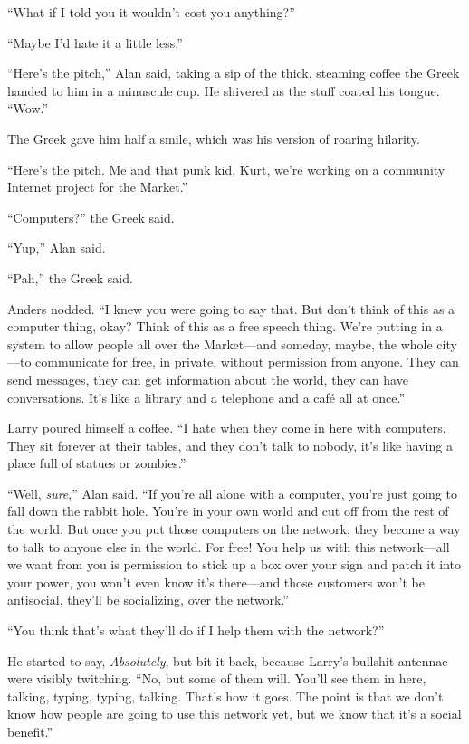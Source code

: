 ``What if I told you it wouldn't cost you anything?''

``Maybe I'd hate it a little less.''

``Here's the pitch,'' Alan said, taking a sip of the thick, steaming
coffee the Greek handed to him in a minuscule cup.  He shivered as the
stuff coated his tongue.  ``Wow.''

The Greek gave him half a smile, which was his version of roaring
hilarity.

``Here's the pitch.  Me and that punk kid, Kurt, we're working on a
community Internet project for the Market.''

``Computers?'' the Greek said.

``Yup,'' Alan said.

``Pah,'' the Greek said.

Anders nodded.  ``I knew you were going to say that.  But don't think
of this as a computer thing, okay?  Think of this as a free speech
thing.  We're putting in a system to allow people all over the
Market---and someday, maybe, the whole city---to communicate for free,
in private, without permission from anyone.  They can send messages,
they can get information about the world, they can have conversations. 
It's like a library and a telephone and a caf\'{e} all at once.''

Larry poured himself a coffee.  ``I hate when they come in here with
computers.  They sit forever at their tables, and they don't talk to
nobody, it's like having a place full of statues or zombies.''

``Well, \textit{sure},'' Alan said.  ``If you're all alone with a
computer, you're just going to fall down the rabbit hole.  You're in
your own world and cut off from the rest of the world.  But once you
put those computers on the network, they become a way to talk to
anyone else in the world.  For free!  You help us with this
network---all we want from you is permission to stick up a box over
your sign and patch it into your power, you won't even know it's
there---and those customers won't be antisocial, they'll be
socializing, over the network.''

``You think that's what they'll do if I help them with the network?''

He started to say, \textit{Absolutely}, but bit it back, because
Larry's bullshit antennae were visibly twitching.  ``No, but some of
them will.  You'll see them in here, talking, typing, typing, talking. 
That's how it goes.  The point is that we don't know how people are
going to use this network yet, but we know that it's a social
benefit.''

